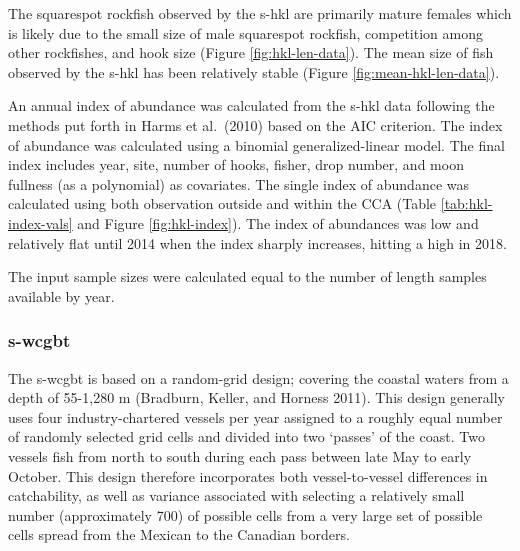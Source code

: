 \documentclass[11pt,
  english,
  a4paper,
]{article}
\begin{document}
\leavevmode\tagmcend\tagstructend\par


The squarespot rockfish observed by the \Gls{s-hkl} are primarily mature females which is likely due to the small size of male squarespot rockfish, competition among other rockfishes, and hook size (Figure \ref{fig:hkl-len-data}). The mean size of fish observed by the \Gls{s-hkl} has been relatively stable (Figure \ref{fig:mean-hkl-len-data}).

\leavevmode\tagmcend\tagstructend\par


An annual index of abundance was calculated from the \Gls{s-hkl} data following the methods put forth in Harms et al.~{(2010)\leavevmode\tagmcend\tagstructend} based on the AIC criterion. The index of abundance was calculated using a binomial generalized-linear model. The final index includes year, site, number of hooks, fisher, drop number, and moon fullness (as a polynomial) as covariates. The single index of abundance was calculated using both observation outside and within the CCA (Table \ref{tab:hkl-index-vals} and Figure \ref{fig:hkl-index}). The index of abundances was low and relatively flat until 2014 when the index sharply increases, hitting a high in 2018.

\leavevmode\tagmcend\tagstructend\par


The input sample sizes were calculated equal to the number of length samples available by year.

\leavevmode\tagmcend\tagstructend\par


\hypertarget{section-1}{%
\subsubsection{\texorpdfstring{\acrlong{s-wcgbt}}{}}\label{section-1}}

\leavevmode\tagmcend\tagstructend


The \Gls{s-wcgbt} is based on a random-grid design; covering the coastal waters from a depth of 55-1,280 m {(Bradburn, Keller, and Horness 2011)\leavevmode\tagmcend\tagstructend}. This design generally uses four industry-chartered vessels per year assigned to a roughly equal number of randomly selected grid cells and divided into two `passes' of the coast. Two vessels fish from north to south during each pass between late May to early October. This design therefore incorporates both vessel-to-vessel differences in catchability, as well as variance associated with selecting a relatively small number (approximately 700) of possible cells from a very large set of possible cells spread from the Mexican to the Canadian borders.
\end{document}
